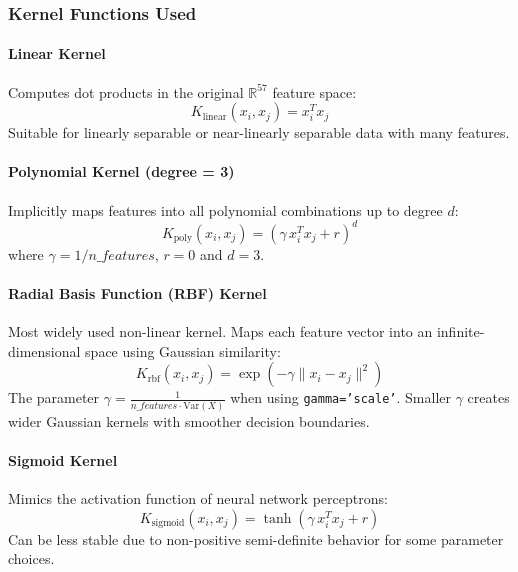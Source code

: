 \documentclass[12pt,a4paper]{article}
\begin{document}
\subsubsection*{Kernel Functions Used}

\paragraph{Linear Kernel}
Computes dot products in the original $\mathbb{R}^{57}$ feature space:
\begin{equation}
K_{\text{linear}}(x_i, x_j) = x_i^T x_j
\end{equation}
Suitable for linearly separable or near-linearly separable data with many features.

\paragraph{Polynomial Kernel (degree = 3)}
Implicitly maps features into all polynomial combinations up to degree $d$:
\begin{equation}
K_{\text{poly}}(x_i, x_j) = (\gamma \, x_i^T x_j + r)^d
\end{equation}
where $\gamma = 1/n\_features$, $r = 0$ and $d = 3$.

\paragraph{Radial Basis Function (RBF) Kernel}
Most widely used non-linear kernel. Maps each feature vector into an infinite-dimensional space using Gaussian similarity:
\begin{equation}
K_{\text{rbf}}(x_i, x_j) = \exp\left(-\gamma \|x_i - x_j\|^2\right)
\end{equation}
The parameter $\gamma = \frac{1}{n\_features \cdot \text{Var}(X)}$ when using \texttt{gamma='scale'}. Smaller $\gamma$ creates wider Gaussian kernels with smoother decision boundaries.

\paragraph{Sigmoid Kernel}
Mimics the activation function of neural network perceptrons:
\begin{equation}
K_{\text{sigmoid}}(x_i, x_j) = \tanh(\gamma \, x_i^T x_j + r)
\end{equation}
Can be less stable due to non-positive semi-definite behavior for some parameter choices.
\end{document}
